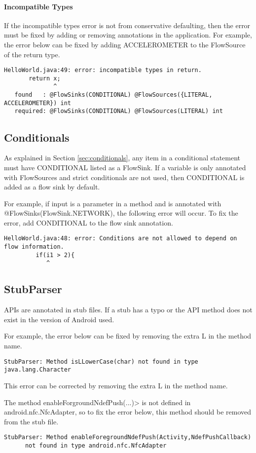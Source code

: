 \paragraph{Incompatible Types}

If the incompatible types error is not from conservative defaulting, then the error must be fixed by adding or
removing annotations in the application.  For example, the error below can be fixed by adding ACCELEROMETER to the FlowSource of the return type.  

\begin{Verbatim}
HelloWorld.java:49: error: incompatible types in return.
       return x;
              ^
   found   : @FlowSinks(CONDITIONAL) @FlowSources({LITERAL, ACCELEROMETER}) int
   required: @FlowSinks(CONDITIONAL) @FlowSources(LITERAL) int
\end{Verbatim}

\subsection{Conditionals}
As explained in Section \ref{sec:conditionals}, any item in a conditional statement must have CONDITIONAL listed as a FlowSink.  If a variable is only annotated with FlowSources and strict conditionals are not used, then CONDITIONAL is added as a flow sink by default. 

For example, if input is a parameter in a method and is annotated with @FlowSinks(FlowSink.NETWORK), the following error will occur.  To fix the error, add CONDITIONAL to the flow sink annotation.  

\begin{Verbatim}
HelloWorld.java:48: error: Conditions are not allowed to depend on flow information.
         if(i1 > 2){
            ^
\end{Verbatim}

\subsection{StubParser}

APIs are annotated in stub files.  If a stub has a typo or the API method does not exist in the version of Android 
used. 

For example, the error below can be fixed by removing the extra L in the method name.

\begin{Verbatim}
StubParser: Method isLLowerCase(char) not found in type java.lang.Character
\end{Verbatim}
This error can be corrected by removing the extra L in the method name.

The method \<enableForgroundNdefPush(...)> is not defined in android.nfc.NfcAdapter, so to fix the error below, this
 method should be removed from the stub file.
\begin{Verbatim}
StubParser: Method enableForegroundNdefPush(Activity,NdefPushCallback) 
      not found in type android.nfc.NfcAdapter
\end{Verbatim}

